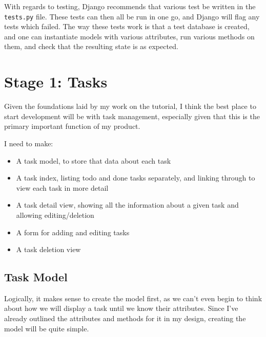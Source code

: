 \documentclass{article}
\begin{document}
With regards to testing,
Django recommends that various test be written in the \texttt{tests.py} file.
These tests can then all be run in one go,
and Django will flag any tests which failed.
The way these tests work is that a test database is created,
and one can instantiate models with various attributes,
run various methods on them,
and check that the resulting state is as expected.

\section{Stage 1: Tasks}
Given the foundations laid by my work on the tutorial,
I think the best place to start development will be with task management,
especially given that this is the primary important function of my product.

I need to make:
\begin{samepage}
	\begin{itemize}
		\item A task model,
		      to store that data about each task
		\item A task index,
		      listing todo and done tasks separately,
		      and linking through to view each task in more detail
		\item A task detail view,
		      showing all the information about a given task and allowing editing/deletion
		\item A form for adding and editing tasks
		\item A task deletion view
	\end{itemize}
\end{samepage}

\subsection{Task Model}
Logically, it makes sense to create the model first,
as we can't even begin to think about how we will display a task until we know their attributes.
Since I've already outlined the attributes and methods for it in my design,
creating the model will be quite simple.
\end{document}
